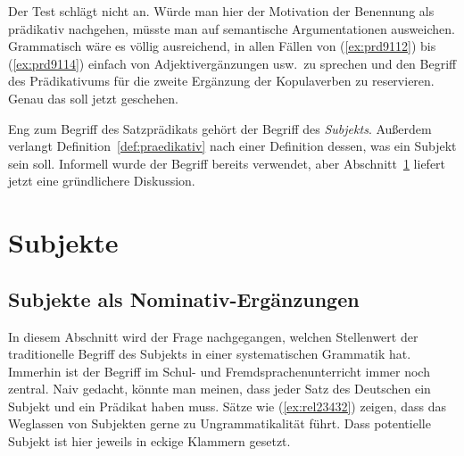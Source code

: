 Der Test schlägt nicht an.
Würde man hier der Motivation der Benennung als prädikativ nachgehen, müsste man auf semantische Argumentationen ausweichen.
Grammatisch wäre es völlig ausreichend, in allen Fällen von (\ref{ex:prd9112}) bis (\ref{ex:prd9114}) einfach von Adjektivergänzungen usw.\ zu sprechen und den Begriff des Prädikativums für die zweite Ergänzung der Kopulaverben zu reservieren.
Genau das soll jetzt geschehen.


Eng zum Begriff des Satzprädikats gehört der Begriff des \textit{Subjekts}.
Außerdem verlangt Definition~\ref{def:praedikativ} nach einer Definition dessen, was ein Subjekt sein soll.
Informell wurde der Begriff bereits verwendet, aber Abschnitt~\ref{sec:subjekt} liefert jetzt eine gründlichere Diskussion.

\section{Subjekte}

\label{sec:subjekt}

\subsection{Subjekte als Nominativ-Ergänzungen}


In diesem Abschnitt wird der Frage nachgegangen, welchen Stellenwert der traditionelle Begriff des Subjekts in einer systematischen Grammatik hat.
Immerhin ist der Begriff im Schul- und Fremdsprachenunterricht immer noch zentral.
Naiv gedacht, könnte man meinen, dass jeder Satz des Deutschen ein Subjekt und ein Prädikat haben muss.
Sätze wie (\ref{ex:rel23432}) zeigen, dass das Weglassen von Subjekten gerne zu Ungrammatikalität führt.
Dass potentielle Subjekt ist hier jeweils in eckige Klammern gesetzt.

\begin{exe}
  \ex\label{ex:rel23432}
  \begin{xlist}
  \end{xlist}
\end{exe}

